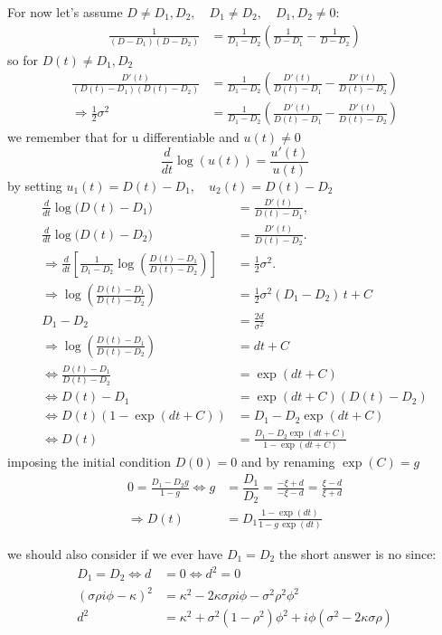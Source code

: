 For now let's assume $D\neq D_1,D_2,\quad D_1\neq D_2,\quad D_1,D_2\neq 0$:
\begin{align}
\frac{1}{(D-D_1)(D-D_2)}&=\frac{1}{D_1-D_2}\left(\frac{1}{D-D_1}-\frac{1}{D-D_2}\right)
\end{align}
so for $D(t)\neq D_1,D_2$
\begin{align}
\frac{D'(t)}{(D(t)-D_1)(D(t)-D_2)}&=\frac{1}{D_1-D_2}\left(\frac{D'(t)}{D(t)-D_1}-\frac{D'(t)}{D(t)-D_2}\right)\\
\Rightarrow \frac{1}{2}\sigma^2&=\frac{1}{D_1-D_2}\left(\frac{D'(t)}{D(t)-D_1}-\frac{D'(t)}{D(t)-D_2}\right)
\end{align}
we remember that for u differentiable and $u(t)\neq 0$
\begin{equation}\frac{d}{dt}\log(u(t))=\frac{u'(t)}{u(t)}\end{equation}
by setting $u_1(t)=D(t)-D_1,\quad u_2(t)=D(t)-D_2$
\begin{align}
\frac{d}{dt}\log(D(t)-D_1\bigr) &=\frac{D'(t)}{D(t)-D_1}, \\
\frac{d}{dt}\log(D(t)-D_2\bigr) &=\frac{D'(t)}{D(t)-D_2}.\\
\Rightarrow\frac{d}{dt}\left[\frac{1}{D_1-D_2}\log\left(\frac{D(t)-D_1}{D(t)-D_2}\right)\right] &= \frac{1}{2}\sigma^2.\\
\Rightarrow\log\left(\frac{D(t)-D_1}{D(t)-D_2}\right)&=\frac{1}{2}\sigma^2(D_1-D_2)\,t + C\\
 D_1-D_2&=\frac{2d}{\sigma^2}\\
\Rightarrow\log\left(\frac{D(t)-D_1}{D(t)-D_2}\right)&=d t +C\\
\Leftrightarrow\frac{D(t)-D_1}{D(t)-D_2}&=\exp(dt+C)\\
\Leftrightarrow D(t)-D_1&=\exp(dt+C)(D(t)-D_2)\\
\Leftrightarrow D(t)(1-\exp(dt+C))&=D_1-D_2\exp(dt+C)\\
\Leftrightarrow D(t)&=\frac{D_1-D_2\exp(dt+C)}{1-\exp(dt+C)}
\end{align}
imposing the initial condition $D(0)=0$ and by renaming $\exp(C)=g$
\begin{align}
0=\frac{D_1-D_2g}{1-g}\Leftrightarrow g&=\dfrac{D_1}{D_2}=\frac{-\xi+d}{-\xi-d}=\frac{\xi-d}{\xi+d}\\
\Rightarrow D(t)&=D_1 \frac{1-\exp(dt)}{1-g\, \exp(dt)}
\end{align}

we should also consider if we ever have $D_1=D_2$
the short answer is no since:
\begin{align}D_1=D_2\Leftrightarrow d&=0\Leftrightarrow d^2=0\\
(\sigma \rho i \phi - \kappa)^2
&= \kappa^2 - 2\kappa \sigma \rho i \phi - \sigma^2 \rho^2 \phi^2\\
d^2&= \kappa^2 + \sigma^2(1-\rho^2)\phi^2 + i\phi(\sigma^2 - 2\kappa \sigma \rho)
\end{align}

